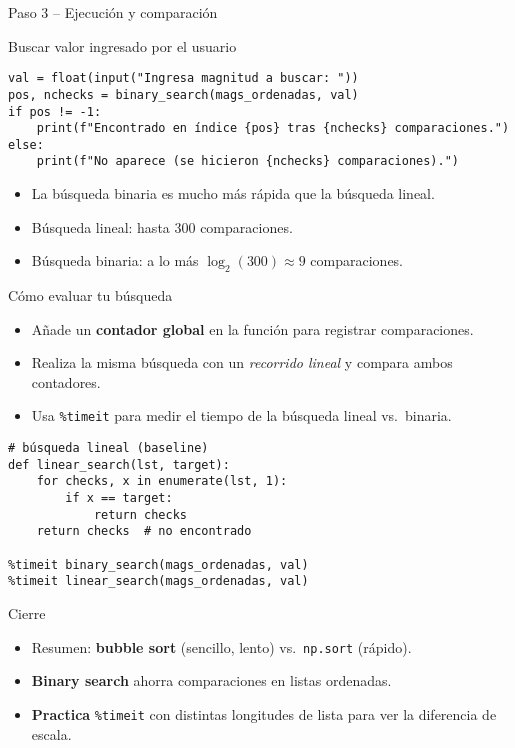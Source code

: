 \documentclass[10pt]{beamer}
\begin{document}
\begin{frame}[fragile]{Paso 3 – Ejecución y comparación}
  \begin{block}{Buscar valor ingresado por el usuario}
  \begin{verbatim}
val = float(input("Ingresa magnitud a buscar: "))
pos, nchecks = binary_search(mags_ordenadas, val)
if pos != -1:
    print(f"Encontrado en índice {pos} tras {nchecks} comparaciones.")
else:
    print(f"No aparece (se hicieron {nchecks} comparaciones).")
  \end{verbatim}
  \end{block}

  \begin{itemize}
    \item La búsqueda binaria es mucho más rápida que la búsqueda lineal.
    \item Búsqueda lineal: hasta 300 comparaciones.
    \item Búsqueda binaria: a lo más \( \log_2(300) \approx 9 \) comparaciones.
  \end{itemize}
\end{frame}





\begin{frame}[fragile]{Cómo evaluar tu búsqueda}
\begin{itemize}
  \item Añade un \textbf{contador global} en la función para registrar comparaciones.  
  \item Realiza la misma búsqueda con un \emph{recorrido lineal} y compara ambos contadores.  
  \item Usa \texttt{\%timeit} para medir el tiempo de la búsqueda lineal vs.\ binaria.  
\end{itemize}

\vspace{0.3cm}
\begin{verbatim}
# búsqueda lineal (baseline)
def linear_search(lst, target):
    for checks, x in enumerate(lst, 1):
        if x == target:
            return checks
    return checks  # no encontrado

%timeit binary_search(mags_ordenadas, val)
%timeit linear_search(mags_ordenadas, val)
\end{verbatim}
\end{frame}

\begin{frame}{Cierre}
\begin{itemize}
  \item Resumen: \textbf{bubble sort} (sencillo, lento) vs.\ \texttt{np.sort} (rápido).  
  \item \textbf{Binary search} ahorra comparaciones en listas ordenadas.  
  \item \textbf{Practica} \texttt{\%timeit} con distintas longitudes de lista para ver la
        diferencia de escala.  
\end{itemize}
\end{frame}
\end{document}
